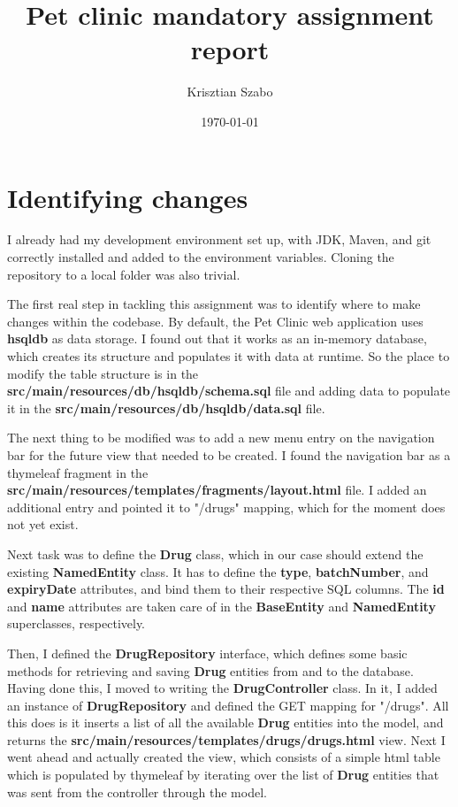 \documentclass[12pt, a4paper]{article}
\title{Pet clinic mandatory assignment report}
\author{Krisztian Szabo}
\date{\today{}}
\begin{document}
\maketitle
{}
\newpage
{}
\section{Identifying changes}
I already had my development environment set up, with JDK, Maven, and git correctly installed and added to the environment variables. Cloning the repository to a local folder was also trivial.

The first real step in tackling this assignment was to identify where to make changes within the codebase. By default, the Pet Clinic web application uses \textbf{hsqldb} as data storage. I found out that it works as an in-memory database, which creates its structure and populates it with data at runtime. So the place to modify the table structure is in the \textbf{src/main/resources/db/hsqldb/schema.sql} file and adding data to populate it in the \textbf{src/main/resources/db/hsqldb/data.sql} file.

The next thing to be modified was to add a new menu entry on the navigation bar for the future view that needed to be created. I found the navigation bar as a thymeleaf fragment in the \textbf{src/main/resources/templates/fragments/layout.html} file. I added an additional entry and pointed it to "/drugs" mapping, which for the moment does not yet exist.

Next task was to define the \textbf{Drug} class, which in our case should extend the existing \textbf{NamedEntity} class. It has to define the \textbf{type}, \textbf{batchNumber}, and \textbf{expiryDate} attributes, and bind them to their respective SQL columns. The \textbf{id} and \textbf{name} attributes are taken care of in the \textbf{BaseEntity} and \textbf{NamedEntity} superclasses, respectively.

Then, I defined the \textbf{DrugRepository} interface, which defines some basic methods for retrieving and saving \textbf{Drug} entities from and to the database. Having done this, I moved to writing the \textbf{DrugController} class. In it, I added an instance of \textbf{DrugRepository} and defined the GET mapping for "/drugs". All this does is it inserts a list of all the available \textbf{Drug} entities into the model, and returns the \textbf{src/main/resources/templates/drugs/drugs.html} view. Next I went ahead and actually created the view, which consists of a simple html table which is populated by thymeleaf by iterating over the list of \textbf{Drug} entities that was sent from the controller through the model.
\end{document}
